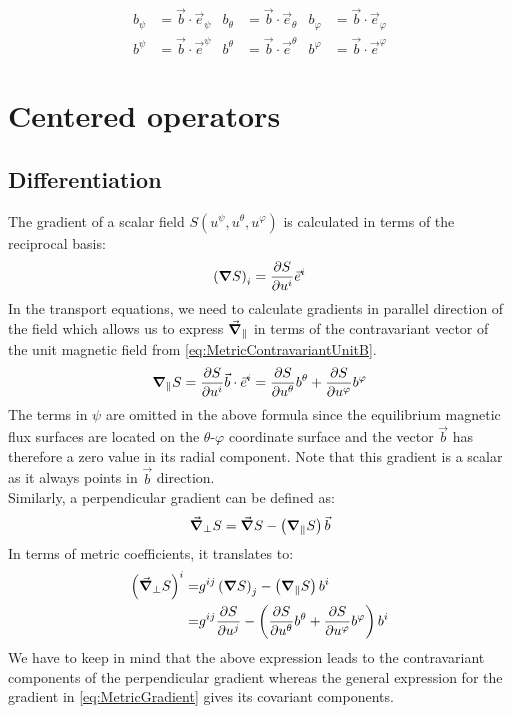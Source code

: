 \begin{align}
	b_\psi &= \vec{b} \cdot \vec{e}_\psi & b_\theta &= \vec{b} \cdot \vec{e}_\theta & b_\varphi &= \vec{b} \cdot \vec{e}_\varphi \label{eq:MetricCovariantUnitB} \\
	b^\psi &= \vec{b} \cdot \vec{e}^\psi & b^\theta &= \vec{b} \cdot \vec{e}^\theta & b^\varphi &= \vec{b} \cdot \vec{e}^\varphi \label{eq:MetricContravariantUnitB}
\end{align} 


\section{Centered operators}
\label{sec:app_centeredOperators}

\subsection{Differentiation}
The gradient of a scalar field $S(u^\psi, u^\theta, u^\varphi)$ is calculated in terms of the reciprocal basis: 
\begin{align}
	\left(\grad{S}\right)_i = \pdv{S}{u^i}\vec{e}^i \label{eq:MetricGradient}
\end{align}
In the transport equations, we need to calculate gradients in parallel direction of the field which allows us to express $\vec{\grad}_\parallel$ in terms of the contravariant vector of the unit magnetic field from \autoref{eq:MetricContravariantUnitB}.
\begin{align}
	\grad_\parallel S = \pdv{S}{u^i}\vec{b}\cdot\vec{e}^i = \pdv{S}{u^\theta}b^\theta + \pdv{S}{u^\varphi}b^\varphi \label{eq:MetricParallelGradient}
\end{align}
The terms in $\psi$ are omitted in the above formula since the equilibrium magnetic flux surfaces are located on the $\theta$-$\varphi$ coordinate surface and the vector $\vec{b}$ has therefore a zero value in its radial component. Note that this gradient is a scalar as it always points in $\vec{b}$ direction. \\
Similarly, a perpendicular gradient can be defined as: 
\begin{equation*}
	\vec{\grad}_\perp S = \vec{\grad} S - \left(\grad_\parallel S\right)\vec{b}
\end{equation*}
In terms of metric coefficients, it translates to: 
\begin{align}
	\label{eq:MetricPerpendicularGradient}
	\left(\vec{\grad}_\perp S\right)^i =& g^{ij}\left(\grad{S}\right)_j - \left(\grad_\parallel S\right)b^i \nonumber \\
	=& g^{ij}\pdv{S}{u^j} - \left(\pdv{S}{u^\theta}b^\theta + \pdv{S}{u^\varphi}b^\varphi\right)b^i
\end{align}
We have to keep in mind that the above expression leads to the contravariant components of the perpendicular gradient whereas the general expression for the gradient in \autoref{eq:MetricGradient} gives its covariant components. \\

